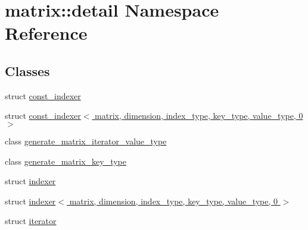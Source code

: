 \hypertarget{namespacematrix_1_1detail}{}\section{matrix\+:\+:detail Namespace Reference}
\label{namespacematrix_1_1detail}
\subsection*{Classes}
\begin{DoxyCompactItemize}
\item 
struct \hyperlink{structmatrix_1_1detail_1_1const__indexer}{const\+\_\+indexer}
\item 
struct \hyperlink{structmatrix_1_1detail_1_1const__indexer_3_01matrix_00_01dimension_00_01index__type_00_01key__type_00_01value__type_00_010_01_4}{const\+\_\+indexer$<$ matrix, dimension, index\+\_\+type, key\+\_\+type, value\+\_\+type, 0 $>$}
\item 
class \hyperlink{classmatrix_1_1detail_1_1generate__matrix__iterator__value__type}{generate\+\_\+matrix\+\_\+iterator\+\_\+value\+\_\+type}
\item 
class \hyperlink{classmatrix_1_1detail_1_1generate__matrix__key__type}{generate\+\_\+matrix\+\_\+key\+\_\+type}
\item 
struct \hyperlink{structmatrix_1_1detail_1_1indexer}{indexer}
\item 
struct \hyperlink{structmatrix_1_1detail_1_1indexer_3_01matrix_00_01dimension_00_01index__type_00_01key__type_00_01value__type_00_010_01_4}{indexer$<$ matrix, dimension, index\+\_\+type, key\+\_\+type, value\+\_\+type, 0 $>$}
\item 
struct \hyperlink{structmatrix_1_1detail_1_1iterator}{iterator}
\end{DoxyCompactItemize}
